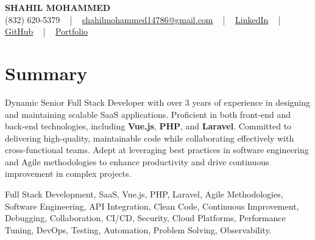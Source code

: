 \documentclass[letterpaper,10pt]{article}
\begin{document}
\begin{center}
    {\fontsize{14pt}{12pt}\selectfont \textbf{\MakeUppercase{Shahil Mohammed}}}\\ \vspace{2pt}
    \fontsize{10pt}{12pt}\selectfont (832) 620-5379 ~ | ~ \href{mailto:shahilmohammed14786@gmail.com}{shahilmohammed14786@gmail.com} ~ | ~  
    \href{https://www.linkedin.com/in/shahil-mohammed-9652931a1/}{\color{blue}\underline{LinkedIn}}  ~ | ~ 
    \href{https://github.com/freakbeast14}{\color{blue}\underline{GitHub}} ~ | ~ 
    \href{https://shahil-mohammed.netlify.app/}{\color{blue}\underline{Portfolio}}
    \vspace{-8pt}
\end{center}

\section{Summary}
\vspace{-2pt}\fontsize{8pt}{9pt}\selectfont
Dynamic Senior Full Stack Developer with over 3 years of experience in designing and maintaining scalable SaaS applications. Proficient in both front-end and back-end technologies, including \textbf{Vue.js}, \textbf{PHP}, and \textbf{Laravel}. Committed to delivering high-quality, maintainable code while collaborating effectively with cross-functional teams. Adept at leveraging best practices in software engineering and Agile methodologies to enhance productivity and drive continuous improvement in complex projects. 
\vspace{-5pt}

{\fontsize{1pt}{1pt}\selectfont\color{white}
Full Stack Development, SaaS, Vue.js, PHP, Laravel, Agile Methodologies, Software Engineering, API Integration, Clean Code, Continuous Improvement, Debugging, Collaboration, CI/CD, Security, Cloud Platforms, Performance Tuning, DevOps, Testing, Automation, Problem Solving, Observability.
}
\vspace{-8pt}

\vspace{-2pt}
\end{document}
